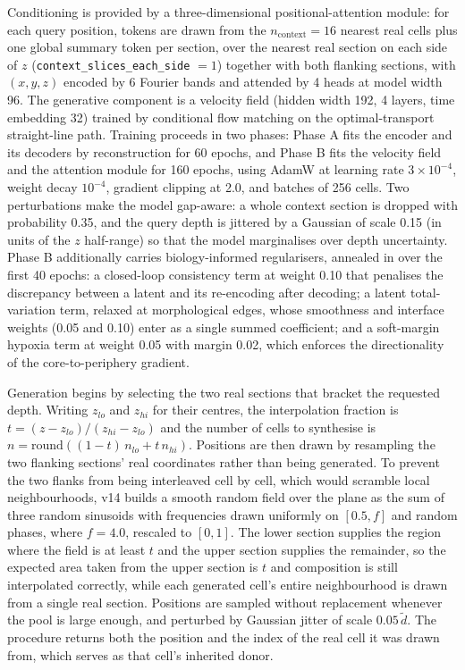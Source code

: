 Conditioning is provided by a three-dimensional positional-attention module: for each query position,
tokens are drawn from the $n_{\textrm{context}} = 16$ nearest real cells plus one global summary token
per section, over the nearest real section on each side of $z$ (\texttt{context\_slices\_each\_side}
$= 1$) together with both flanking sections, with $(x, y, z)$ encoded by 6 Fourier bands and attended
by 4 heads at model width 96. The generative component is a velocity field (hidden width 192, 4
layers, time embedding 32) trained by conditional flow matching on the optimal-transport
straight-line path. Training proceeds in two phases: Phase A fits the encoder and its decoders by
reconstruction for 60 epochs, and Phase B fits the velocity field and the attention module for 160
epochs, using AdamW at learning rate $3\times 10^{-4}$, weight decay $10^{-4}$, gradient clipping at
2.0, and batches of 256 cells. Two perturbations make the model gap-aware: a whole context section is
dropped with probability 0.35, and the query depth is jittered by a Gaussian of scale 0.15 (in units
of the $z$ half-range) so that the model marginalises over depth uncertainty. Phase B additionally
carries biology-informed regularisers, annealed in over the first 40 epochs: a closed-loop
consistency term at weight 0.10 that penalises the discrepancy between a latent and its
re-encoding after decoding; a latent total-variation term, relaxed at morphological edges, whose
smoothness and interface weights (0.05 and 0.10) enter as a single summed coefficient; and a
soft-margin hypoxia term at weight 0.05 with margin 0.02, which enforces the directionality of the
core-to-periphery gradient.

Generation begins by selecting the two real sections that bracket the requested depth. Writing
$z_{lo}$ and $z_{hi}$ for their centres, the interpolation fraction is
$t = (z - z_{lo}) / (z_{hi} - z_{lo})$ and the number of cells to synthesise is
$n = \textrm{round}\left((1-t) \, n_{lo} + t \, n_{hi}\right)$. Positions are then drawn by resampling
the two flanking sections' real coordinates rather than being generated. To prevent the two flanks
from being interleaved cell by cell, which would scramble local neighbourhoods, v14 builds a smooth
random field over the plane as the sum of three random sinusoids with frequencies drawn uniformly on
$[0.5, f]$ and random phases, where $f = 4.0$, rescaled to $[0, 1]$. The lower section supplies the
region where the field is at least $t$ and the upper section supplies the remainder, so the expected
area taken from the upper section is $t$ and composition is still interpolated correctly, while each
generated cell's entire neighbourhood is drawn from a single real section. Positions are sampled
without replacement whenever the pool is large enough, and perturbed by Gaussian jitter of scale
$0.05 \, \tilde{d}$. The procedure returns both the position and the index of the real cell it was
drawn from, which serves as that cell's inherited donor.


